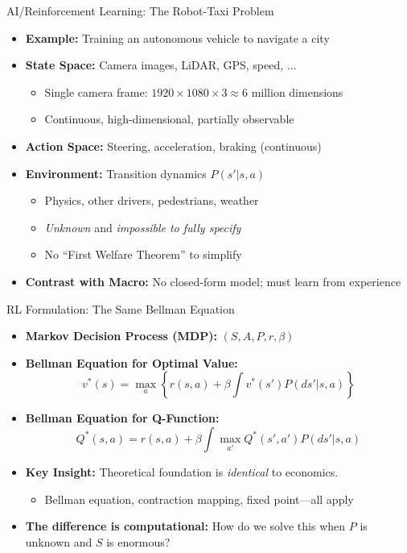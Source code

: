 \documentclass[10pt,english,aspectratio=169]{beamer}
\begin{document}
\begin{frame}{AI/Reinforcement Learning: The Robot-Taxi Problem}
\begin{itemize}
\item \textbf{Example:} Training an autonomous vehicle to navigate a city

\medskip
\item \textbf{State Space:} Camera images, LiDAR, GPS, speed, ...
\begin{itemize}
    \item Single camera frame: $1920 \times 1080 \times 3 \approx 6$ million dimensions
    \item Continuous, high-dimensional, partially observable
\end{itemize}

\medskip
\item \textbf{Action Space:} Steering, acceleration, braking (continuous)

\medskip
\item \textbf{Environment:} Transition dynamics $P(s'|s, a)$
\begin{itemize}
    \item Physics, other drivers, pedestrians, weather
    \item \emph{Unknown} and \emph{impossible to fully specify}
    \item No ``First Welfare Theorem'' to simplify
\end{itemize}

\medskip
\item \textbf{Contrast with Macro:} No closed-form model; must learn from experience
\end{itemize}
\end{frame}

\begin{frame}{RL Formulation: The Same Bellman Equation}
\begin{itemize}
\item \textbf{Markov Decision Process (MDP):} $(S, A, P, r, \beta)$

\medskip
\item \textbf{Bellman Equation for Optimal Value:}
\[
v^*(s) = \max_{a} \left\{ r(s, a) + \beta \int v^*(s') P(ds'|s, a) \right\}
\]

\medskip
\item \textbf{Bellman Equation for Q-Function:}
\[
Q^*(s, a) = r(s, a) + \beta \int \max_{a'} Q^*(s', a') P(ds'|s, a)
\]

\medskip
\item \textbf{Key Insight:} Theoretical foundation is \emph{identical} to economics.
\begin{itemize}
    \item Bellman equation, contraction mapping, fixed point---all apply
\end{itemize}

\medskip
\item \textbf{The difference is computational:} How do we solve this when $P$ is unknown and $S$ is enormous?
\end{itemize}
\end{frame}
\end{document}
